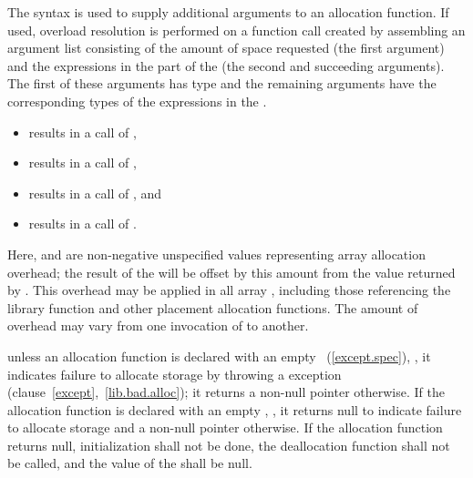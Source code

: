 \pnum
{}%
The  syntax is used to supply additional
arguments to an allocation function. If used, overload resolution is
performed on a function call created by assembling an argument list
consisting of the amount of space requested (the first argument) and the
expressions in the  part of the
 (the second and succeeding arguments). The
first of these arguments has type  and the remaining
arguments have the corresponding types of the expressions in the
.

\pnum
\enterexample 

\begin{itemize}
\item {} results in a call of ,

\item {} results in a call of ,

\item {} results in a call of , and

\item {} results in a call of .
\end{itemize}

Here,  and  are non-negative unspecified values
representing array allocation overhead; the result of the
 will be offset by this amount from the value
returned by . This overhead may be applied in all
array , including those referencing the
library function  and other
placement allocation functions. The amount of overhead may vary from one
invocation of  to another.
\exitexample 

\pnum
\enternote 
unless an allocation function is declared with an empty
~(\ref{except.spec}), ,
it indicates failure to allocate storage by throwing a
%
%
 exception (clause~\ref{except},~\ref{lib.bad.alloc});
it returns a non-null pointer otherwise. If the allocation function is
declared with an empty ,
, it returns null to indicate failure to allocate storage
and a non-null pointer otherwise.
\exitnote 
If the allocation function returns null, initialization shall not be
done, the deallocation function shall not be called, and the value of
the  shall be null.

